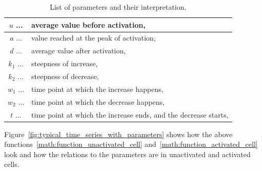 \begin{table}[h!]
	\centering
	\begin{tabular}{|cl|}
		\hline
		$u$ ... & average value before activation, \\
		\hline
		$a$ ... & value reached at the peak of activation, \\
		\hline
		$d$ ... & average value after activation, \\
		\hline
		$k_1$ ... & steepness of increase, \\
		\hline
		$k_2$ ... & steepness of decrease, \\
		\hline
		$w_1$ ... & time point at which the increase happens, \\
		\hline
		$w_2$ ... & time point at which the decrease happens, \\
		\hline
		$t$ ... & time point at which the increase ends, and the decrease starts, \\
		\hline
	\end{tabular}
	\label{tab:parameters}
	\caption{List of parameters and their interpretation.}
\end{table}

Figure~\ref{fig:typical_time_series_with_parameters} shows how the above functions~\ref{math:function_unactivated_cell} and~\ref{math:function_activated_cell} look and how the relations to the parameters are in unactivated and activated cells.



